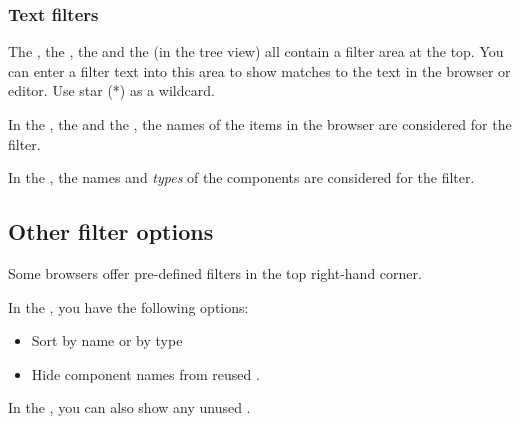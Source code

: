 
\subsubsection{Text filters}

The \gdtestcasebrowser{}, the \gdtestsuitebrowser{}, the \gdcompnamebrowser{} and the \gdomeditor{} (in the tree view) all contain a filter area at the top. You can enter a filter text into this area to show matches to the text in the browser or editor. Use star (*) as a wildcard. 

In the \gdtestcasebrowser{}, the \gdcompnamebrowser{} and the \gdtestsuitebrowser{}, the names of the items in the browser are  considered for the filter.

In the \gdomeditor{}, the names and \emph{types} of the components are considered for the filter. 


\subsection{Other filter options}

Some browsers offer pre-defined filters in the top right-hand corner.

In the \gdcompnamebrowser{}, you have the following options:

\begin{itemize}
\item Sort by name or by type
\item Hide component names from reused \gdprojects{}.
\end{itemize}

In the \gdtestcasebrowser{}, you can also show any unused \gdcases{}. 
